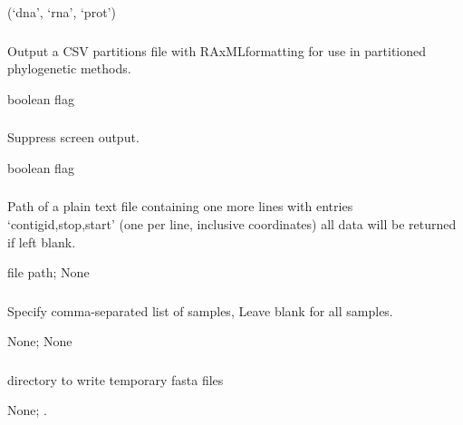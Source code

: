 \documentclass[letterpaper,11pt,english]{sphinxmanual}
\begin{document}
 (‘dna’, ‘rna’, ‘prot’)


\subsubsection{}
\label{\detokenize{prog_desc:partition}}
 Output a CSV partitions file with RAxMLformatting for use in partitioned phylogenetic methods.

 boolean flag


\subsubsection{}
\label{\detokenize{prog_desc:id27}}
 Suppress screen output.

 boolean flag


\subsubsection{}
\label{\detokenize{prog_desc:id28}}
 Path of a plain text file containing one more lines with entries ‘contigid,stop,start’ (one per line, inclusive coordinates) all data will be returned if left blank.

 file path;  None


\subsubsection{}
\label{\detokenize{prog_desc:id29}}
 Specify comma-separated list of samples, Leave blank for all samples.

 None;  None


\subsubsection{}
\label{\detokenize{prog_desc:id30}}
 directory to write temporary fasta files

 None;  .
\end{document}
